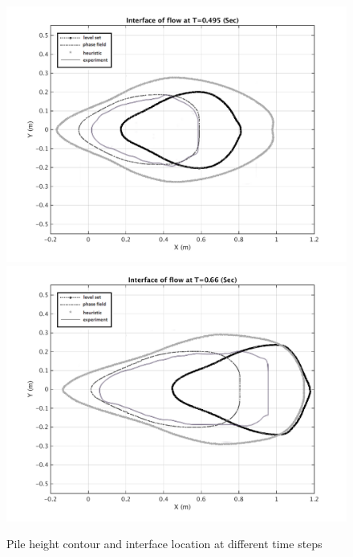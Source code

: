 \documentclass[letterpaper,10pt]{article}
\begin{document}
\begin{figure}[H]
\begin{minipage}[b]{.48 \linewidth}
                \includegraphics[width=1\textwidth]{IMAGES/interface495exp.png}
                \includegraphics[width=1\textwidth]{IMAGES/interface660exp.png}
        \end{minipage}
        \caption{Pile height contour and interface location at different time steps}
        \label{odinary}
\end{figure}
\end{document}
